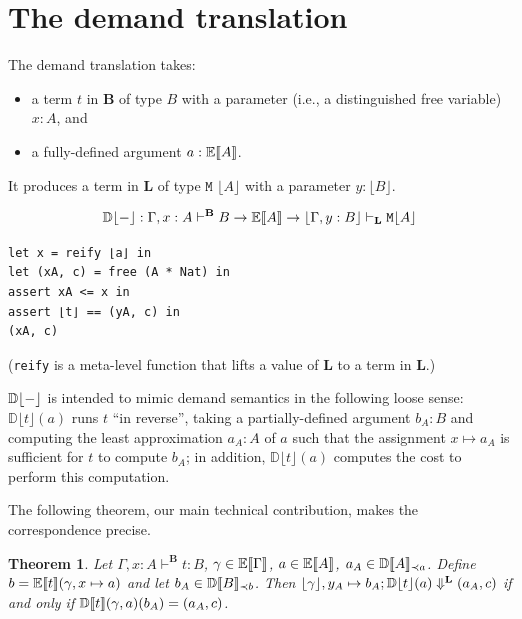 \documentclass[11pt]{article}
\DeclarePairedDelimiter{\floor}{\lfloor}{\rfloor}
\DeclarePairedDelimiter{\bbrackets}{\llbracket}{\rrbracket}
\newtheorem{theorem}{Theorem}
\newcommand{\LB}{\mathbf{B}}
\newcommand{\LL}{\mathbf{L}}
\newcommand{\BE}{\mathbb{E}}
\newcommand{\Eval}[1]{\BE\bbrackets{#1}}
\newcommand{\BD}{\mathbb{D}}
\newcommand{\Demand}[1]{\BD\bbrackets{#1}}
\begin{document}
\section{The demand translation}
\label{sec:org2f167e0}

The demand translation takes:

\begin{itemize}
\item a term \(t\) in \(\LB\) of type \(B\) with a parameter (i.e., a distinguished free variable) \(x : A\), and
\item a fully-defined argument \(a : \Eval{A}\).
\end{itemize}

It produces a term in \(\mathbf{L}\) of type \(\texttt{M $\lfloor A \rfloor$}\) with a parameter \(y : \lfloor B \rfloor\).

\[
 \mathbb{D}\lfloor - \rfloor : \Gamma, x : A \vdash^\LB B \to \Eval{A} \to \lfloor \Gamma , y : B \rfloor \vdash_\mathbf{L} \texttt{M} \lfloor A \rfloor
\]

\begin{verbatim}
let x = reify ⌊a⌋ in
let (xA, c) = free (A * Nat) in
assert xA <= x in
assert ⌊t⌋ == (yA, c) in
(xA, c)
\end{verbatim}

(\texttt{reify} is a meta-level function that lifts a value of \(\LL\) to a term in \(\LL\).)

\(\mathbb{D}\floor{-}\) is intended to mimic demand semantics in the following loose sense: \(\mathbb{D}\lfloor t \rfloor(a)\) runs \(t\) “in reverse”, taking a partially-defined argument \(b_A : B\) and computing the least approximation \(a_A : A\) of \(a\) such that the assignment \(x \mapsto a_A\) is sufficient for \(t\) to compute \(b_A\); in addition, \(\mathbb{D}\lfloor t \rfloor(a)\) computes the cost to perform this computation.

The following theorem, our main technical contribution, makes the correspondence precise.

\begin{theorem}
Let \(\Gamma, x : A \vdash^\LB t : B\), \(\gamma \in \Eval{\Gamma}\), \(a \in \Eval{A}\), \(a_A \in \Demand{A}_{\prec a}\).  Define \(b = \Eval{t}(\gamma, x \mapsto a)\) and let \(b_A \in \Demand{B}_{\prec b}\).  Then \(\floor{\gamma}, y_A \mapsto b_A ; \mathbb{D}\floor{t}(a) \Downarrow^\mathbf{L} (a_A, c)\) if and only if \(\Demand{t}(\gamma, a)(b_A) = (a_A, c)\).
\end{theorem}
\end{document}
